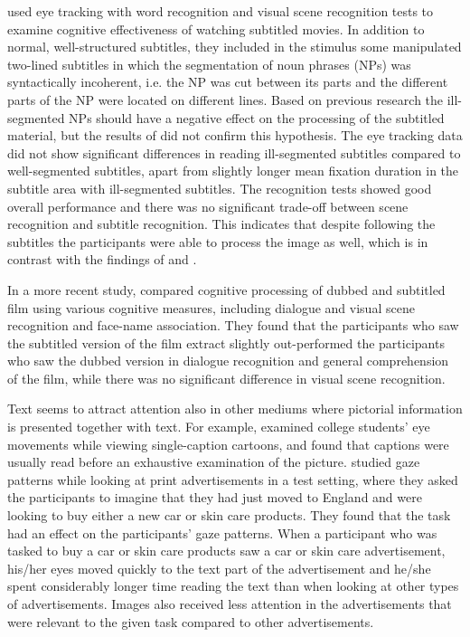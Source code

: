 \documentclass[output=paper]{langsci/langscibook}
\begin{document}
\citet{Perego2010} used eye tracking with word recognition and visual scene recognition tests to examine cognitive effectiveness of watching subtitled movies. In addition to normal, well-structured subtitles, they included in the stimulus some manipulated two-lined subtitles in which the segmentation of noun phrases (NPs) was syntactically incoherent, i.e. the NP was cut between its parts and the different parts of the NP were located on different lines. Based on previous research \citep{Perego2008} the ill-segmented NPs should have a negative effect on the processing of the subtitled material, but the results of \citet{Perego2010} did not confirm this hypothesis. The eye tracking data did not show significant differences in reading ill-segmented subtitles compared to well-segmented subtitles, apart from slightly longer mean fixation duration in the subtitle area with ill-segmented subtitles. The recognition tests showed good overall performance and there was no significant trade-off between scene recognition and subtitle recognition. This indicates that despite following the subtitles the participants were able to process the image as well, which is in contrast with the findings of \citet{lee2013} and \citet{lavaur2011}.

In a more recent study, \citet{Perego2015} compared cognitive processing of dubbed and subtitled film using various cognitive measures, including dialogue and visual scene recognition and face-name association. They found that the participants who saw the subtitled version of the film extract slightly out-performed the participants who saw the dubbed version in dialogue recognition and general comprehension of the film, while there was no significant difference in visual scene recognition. 

Text seems to attract attention also in other mediums where pictorial information is presented together with text. For example, \citet{carroll1992} examined college students' eye movements while viewing single-caption cartoons, and found that captions were usually read before an exhaustive examination of the picture. \citet{rayner2001} studied gaze patterns while looking at print advertisements in a test setting, where they asked the participants to imagine that they had just moved to England and were looking to buy either a new car or skin care products. They found that the task had an effect on the participants' gaze patterns. When a participant who was tasked to buy a car or skin care products saw a car or skin care advertisement, his/her eyes moved quickly to the text part of the advertisement and he/she spent considerably longer time reading the text than when looking at other types of advertisements. Images also received less attention in the advertisements that were relevant to the given task compared to other advertisements.
\end{document}
